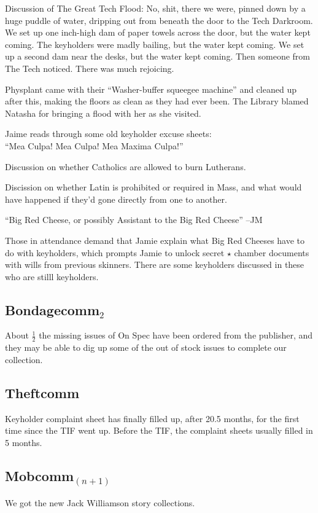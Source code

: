 \documentclass[10pt]{article}
\begin{document}
Discussion of The Great Tech Flood: 
No, shit, there we were, pinned down by a huge puddle of water,
dripping out from beneath the door to the Tech Darkroom.  We set up
one inch-high dam of paper towels across the door, but the water kept
coming. The keyholders were madly bailing, but the water kept coming.  We set
up a second dam near the desks, but the water kept coming.  Then
someone from The Tech noticed.  There was much rejoicing.

Physplant came with their ``Washer-buffer squeegee machine''
and cleaned up after this, making the floors as clean as they had
ever been.  The Library blamed Natasha for bringing a flood with her
as she visited.

Jaime reads through some old keyholder excuse sheets:\\
``Mea Culpa! Mea Culpa! Mea Maxima Culpa!''

Discussion on whether Catholics are allowed to burn Lutherans.

Discission on whether Latin is prohibited or required in Mass, and
what would have happened if they'd gone directly from one to another.

``Big Red Cheese, or possibly Assistant to the Big Red Cheese''
--JM

Those in attendance demand that Jamie explain what Big Red Cheeses
have to do with keyholders, which prompts Jamie to
unlock secret $\star$ chamber documents with wills from previous skinners.
There are some keyholders discussed in these who are stilll keyholders.

\subsection*{Bondagecomm$_2$}
About $\frac{1}{2}$ the missing issues of On Spec have been ordered from the
publisher, and they may be able to dig up some of the out of stock
issues to complete our collection.

\subsection*{Theftcomm}
Keyholder complaint sheet has finally filled up, after 20.5 months,
for the first time since the TIF went up. Before the TIF, the
complaint sheets usually filled in 5 months.

\subsection*{Mobcomm$_{(n+1)}$}
We got the new Jack Williamson story collections.
\end{document}
